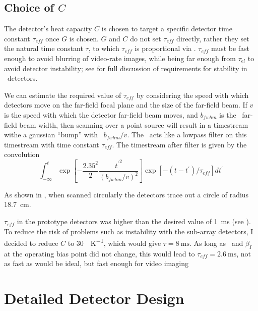 \subsection{Choice of $C$}

The detector's heat capacity $C$ is chosen to target a specific detector time constant $\tau_{eff}$ once $G$ is chosen.
$G$ and $C$ do not set $\tau_{eff}$ directly, rather they set the natural time constant $\tau$, to which $\tau_{eff}$ is proportional via .
$\tau_{eff}$ must be fast enough to avoid blurring of video-rate images, while being far enough from $\tau_{el}$ to avoid detector instability; see  \cite{irwin_transition-edge_2005} for full discussion of requirements for stability in \TES\ detectors.

We can estimate the required value of $\tau_{eff}$ by considering the speed with which detectors move on the far-field focal plane and the size of the far-field beam.
If $v$ is the speed with which the detector far-field beam moves, and $b_{fwhm}$ is the \FHWM\ far-field beam width, then scanning over a point source will result in a timestream withe a gaussian ``bump'' with \FHWM\ $b_{fwhm} / v$.
The \TES\ acts like a lowpass filter on this timestream with time constant $\tau_{eff}$.
The timestream after filter is given by the convolution
\begin{equation}
  \int_{-\infty}^{t} \exp{\left[-\frac{2.35^2}{2} \frac{{t^{\prime}}^2}{(b_{fwhm}/v)^2}\right]}
       \exp{\left[-(t-t^{\prime})/\tau_{eff}\right]} dt^{\prime}
\end{equation}

As shown in , when scanned circularly the detectors trace out a circle of radius \SI{18.7}{\cm}.
 

$\tau_{eff}$ in the prototype detectors was higher than the desired value of \SI{1}{\ms} (see ).
To reduce the risk of problems such as instability with the sub-array detectors, I decided to reduce $C$ to \SI{30}{\pJ\per\K}, which would give $\tau = \SI{8}{\ms}$.
As long as \Loop\ and $\beta_I$ at the operating bias point did not change, this would lead to $\tau_{eff} = \SI{2.6}{\ms}$, not as fast as would be ideal, but fast enough for video imaging

\section{Detailed Detector Design} \label{sec:ch5-det-design}

